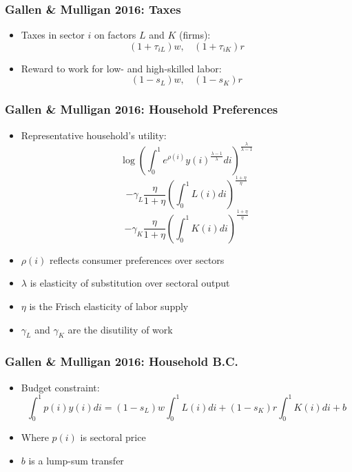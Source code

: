 \documentclass{beamer}
\begin{document}
\begin{frame}
\frametitle[alignment=center]{Gallen \& Mulligan 2016: Taxes}
\begin{itemize}
\item Taxes in sector $i$ on factors $L$ and $K$ (firms):
$$(1+\tau_{iL})w,\ \ \ \ (1+\tau_{iK})r$$
\item Reward to work for low- and high-skilled labor:
$$(1-s_L)w,\ \ \ \ (1-s_K)r$$
\end{itemize}
\end{frame}

\begin{frame}
\frametitle[alignment=center]{Gallen \& Mulligan 2016: Household Preferences}
\begin{itemize}
\item Representative household's utility:
$$\log\left(\int_0^1e^{\rho(i)}y(i)^\frac{\lambda-1}{\lambda}di\right)^\frac{\lambda}{\lambda-1}$$
$$-\gamma_L\frac{\eta}{1+\eta}\left(\int_0^1L(i)di\right)^\frac{1+\eta}{\eta}$$
$$-\gamma_K\frac{\eta}{1+\eta}\left(\int_0^1K(i)di\right)^\frac{1+\eta}{\eta}$$
\item $\rho(i)$ reflects consumer preferences over sectors
\item $\lambda$ is elasticity of substitution over sectoral output
\item $\eta$ is the Frisch elasticity of labor supply
\item $\gamma_L$ and $\gamma_K$ are the disutility of work
\end{itemize}
\end{frame}

\begin{frame}
\frametitle[alignment=center]{Gallen \& Mulligan 2016: Household B.C.}
\begin{itemize}
\item Budget constraint:
$$\int_0^1p(i)y(i)di=(1-s_L)w\int_0^1L(i)di+(1-s_K)r\int_0^1K(i)di+b$$
\item Where $p(i)$ is sectoral price
\item  $b$ is a lump-sum transfer
\end{itemize}
\end{frame}
\end{document}
